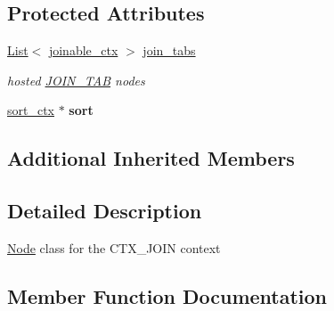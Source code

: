 \subsection*{Protected Attributes}
\begin{DoxyCompactItemize}
\item 
\mbox{\label{classopt__explain__json__namespace_1_1join__ctx_ad9e2de65f5e96a8b1e1e3be83d24f89d}} 
\mbox{\hyperlink{classList}{List}}$<$ \mbox{\hyperlink{classopt__explain__json__namespace_1_1joinable__ctx}{joinable\+\_\+ctx}} $>$ \mbox{\hyperlink{classopt__explain__json__namespace_1_1join__ctx_ad9e2de65f5e96a8b1e1e3be83d24f89d}{join\+\_\+tabs}}
\begin{DoxyCompactList}\small\item\em hosted \mbox{\hyperlink{classJOIN__TAB}{J\+O\+I\+N\+\_\+\+T\+AB}} nodes \end{DoxyCompactList}\item 
\mbox{\label{classopt__explain__json__namespace_1_1join__ctx_af511f7c67d9697ce2ee21407d6005a06}} 
\mbox{\hyperlink{classopt__explain__json__namespace_1_1sort__ctx}{sort\+\_\+ctx}} $\ast$ {\bfseries sort}
\end{DoxyCompactItemize}
\subsection*{Additional Inherited Members}


\subsection{Detailed Description}
\mbox{\hyperlink{classNode}{Node}} class for the C\+T\+X\+\_\+\+J\+O\+IN context 

\subsection{Member Function Documentation}
\mbox{\label{classopt__explain__json__namespace_1_1join__ctx_a2eec52e554d339b5f45630e7f8cf5d41}} 
